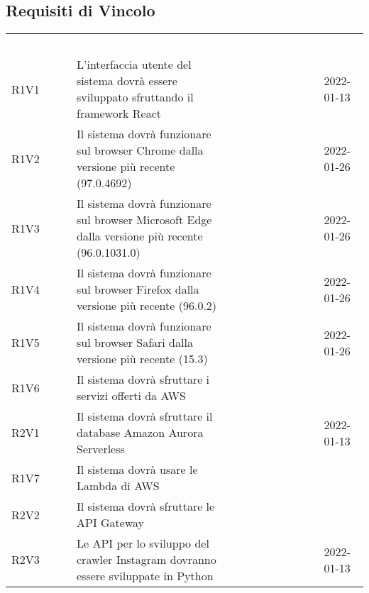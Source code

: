 \subsection{Requisiti di Vincolo}


\renewcommand{\arraystretch}{1.5}
\begin{longtable}{ m{}<{\centering}  m{}<{\centering}  m{}<{\centering}  m{}<{\centering}}
	\rowcolor{darkblue}
	\textcolor{white}{\textbf{Requisito}} &\textcolor{white}{\textbf{Descrizione}}& \textcolor{white}{\textbf{Classificazione}} & \textcolor{white}{\textbf{Fonti}}\\ 

	R1V1 & L’interfaccia utente del sistema dovrà essere sviluppato sfruttando il framework React & \Ob & \Vi{} 2022-01-13 \\	

	R1V2 & Il sistema dovrà funzionare sul browser Chrome dalla versione più recente (97.0.4692) & \Ob & \Ve{} 2022-01-26 \\	
	 
	R1V3 & Il sistema dovrà funzionare sul browser Microsoft Edge dalla versione più recente (96.0.1031.0) & \Ob & \Ve{} 2022-01-26 \\	

	R1V4 & Il sistema dovrà funzionare sul browser Firefox dalla versione più recente (96.0.2) & \Ob & \Ve{} 2022-01-26 \\	
	 
	R1V5 & Il sistema dovrà funzionare sul browser Safari dalla versione più recente (15.3) & \Ob & \Ve{} 2022-01-26 \\	
	 
	R1V6 & Il sistema dovrà sfruttare i servizi offerti da AWS & \Ob & \Ca \\	
	 
	R2V1 & Il sistema dovrà sfruttare il database Amazon Aurora Serverless & \De & \Vi{} 2022-01-13 \\
	
	R1V7 & Il sistema dovrà usare le Lambda di AWS & \Ob & \Ca \\	
	 
	R2V2 & Il sistema dovrà sfruttare le API Gateway & \Ob & \Ca \\	 

	R2V3 & Le API per lo sviluppo del crawler Instagram dovranno essere sviluppate in Python & \De & \Vi{} 2022-01-13 \\	
	 

\end{longtable}
